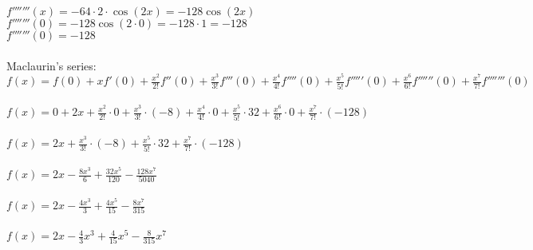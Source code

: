 \documentclass[a4paper, 10pt]{scrartcl}
\begin{document}
$f'''''''(x) = -64 \cdot 2 \cdot \cos{(2x)} = -128 \cos{(2x)}$\\
$f'''''''(0) = -128 \cos{(2 \cdot 0)} = -128 \cdot 1 = -128$\\
$f'''''''(0) = -128$\\
\\Maclaurin's series:\\
$f(x) = f(0) + xf'(0) + \frac{x^{2}}{2!}f''(0) + \frac{x^{3}}{3!}f'''(0) + \frac{x^{4}}{4!}f''''(0) + \frac{x^{5}}{5!}f'''''(0) + \frac{x^{6}}{6!}f''''''(0) + \frac{x^{7}}{7!}f'''''''(0)$\\
\\
$f(x) = 0 + 2x + \frac{x^{2}}{2!} \cdot 0 + \frac{x^{3}}{3!} \cdot (-8) + \frac{x^{4}}{4!} \cdot 0 + \frac{x^{5}}{5!} \cdot 32 + \frac{x^{6}}{6!} \cdot 0 + \frac{x^{7}}{7!} \cdot (-128)$\\
\\
$f(x) = 2x + \frac{x^{3}}{3!} \cdot (-8) + \frac{x^{5}}{5!} \cdot 32 + \frac{x^{7}}{7!} \cdot (-128)$\\
\\
$f(x) = 2x - \frac{8x^{3}}{6} + \frac{32x^{5}}{120} - \frac{128x^{7}}{5040}$\\
\\
$f(x) = 2x - \frac{4x^{3}}{3} + \frac{4x^{5}}{15} - \frac{8x^{7}}{315}$\\
\\
$f(x) = 2x - \frac{4}{3}x^{3} + \frac{4}{15}x^{5} - \frac{8}{315}x^{7}$\\
\end{document}

